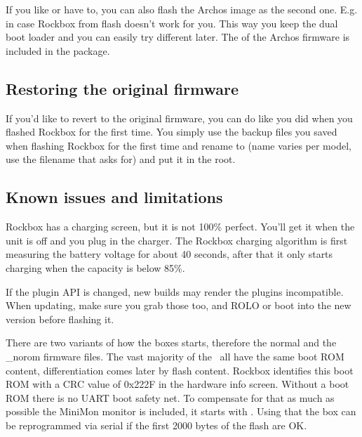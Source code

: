 If you like or have to, you can also flash the Archos image as the second one. 
E.g. in case Rockbox from flash doesn't work for you. This way you keep the dual 
boot loader and you can easily try different later. The  of the Archos
firmware is included in the package.

\subsection{Restoring the original firmware}
If you'd like to revert to the original firmware, you can do like you did when 
you flashed Rockbox for the first time. You simply use the backup files you saved
when flashing Rockbox for the first time and rename  to  (name varies per model, use the filename that  asks for) and put it in the root.

\subsection{Known issues and limitations}
Rockbox has a charging screen, but it is not 100\% perfect. You'll get it when 
the unit is off and you plug in the charger. The Rockbox charging algorithm is 
first measuring the battery voltage for about 40 seconds, after that it only 
starts charging when the capacity is below 85\%. 

If the plugin API is changed, new builds may render the plugins incompatible. 
When updating, make sure you grab those too, and ROLO or  boot into the 
new version before flashing it.

There are two variants of how the boxes starts, therefore the normal and the 
\_norom firmware files. The vast majority of the \daps\ all have the same boot 
ROM content, differentiation comes later by flash content. Rockbox identifies 
this boot ROM with a CRC value of 0x222F in the hardware info screen. 
Without a boot ROM  there is no UART boot safety net. To compensate for that as 
much as possible the MiniMon monitor is included, it starts with .
Using that the box can be reprogrammed via serial if the first 2000 bytes of the
flash are OK.

